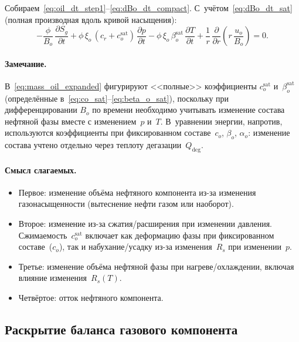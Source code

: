 \documentclass[12pt,a4paper]{article}
\begin{document}
Собираем~\eqref{eq:oil_dt_step1}--\eqref{eq:dBo_dt_compact}.
С~учётом~\eqref{eq:dBo_dt_sat} (полная производная вдоль кривой
насыщения):
\begin{equation}\label{eq:mass_oil_expanded}
  \boxed{
    -\frac{\phi}{B_o}\,\frac{\partial S_g}{\partial t}
    + \phi\,\xi_o\,(c_r + c_o^{\mathrm{sat}})\,\frac{\partial p}{\partial t}
    - \phi\,\xi_o\,\beta_o^{\mathrm{sat}}\,\frac{\partial T}{\partial t}
    + \frac{1}{r}\,\frac{\partial}{\partial r}\!
      \left(r\,\frac{u_o}{B_o}\right) = 0.
  }
\end{equation}

\paragraph{Замечание.}
В~\eqref{eq:mass_oil_expanded} фигурируют <<полные>> коэффициенты
$c_o^{\mathrm{sat}}$ и~$\beta_o^{\mathrm{sat}}$
(определённые в~\eqref{eq:co_sat}--\eqref{eq:beta_o_sat}),
поскольку при дифференцировании $B_o$ по времени необходимо учитывать
изменение состава нефтяной фазы вместе с изменением~$p$ и~$T$.
В~уравнении энергии, напротив, используются коэффициенты при
фиксированном составе~$c_o$, $\beta_o$, $\alpha_o$: изменение состава
учтено отдельно через теплоту дегазации~$Q_{\mathrm{deg}}$.

\paragraph{Смысл слагаемых.}
\begin{itemize}[nosep]
  \item Первое: изменение объёма нефтяного компонента из-за изменения
        газонасыщенности (вытеснение нефти газом или наоборот).
  \item Второе: изменение из-за сжатия/расширения при изменении давления.
        Сжимаемость~$c_o^{\mathrm{sat}}$ включает как деформацию фазы
        при фиксированном составе~($c_o$), так и набухание/усадку из-за
        изменения~$R_s$ при изменении~$p$.
  \item Третье: изменение объёма нефтяной фазы при нагреве/охлаждении,
        включая влияние изменения~$R_s(T)$.
  \item Четвёртое: отток нефтяного компонента.
\end{itemize}

\subsection{Раскрытие баланса газового компонента}\label{ssec:gas_expand}
\end{document}
